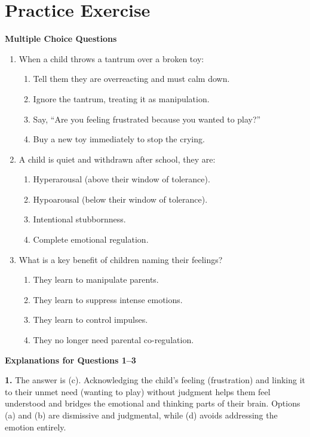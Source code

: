 \section{Practice Exercise}
\begin{practiceexercise}
\textbf{Multiple Choice Questions}
\begin{enumerate}
    \item When a child throws a tantrum over a broken toy:
    \begin{enumerate}
        \item Tell them they are overreacting and must calm down.
        \item Ignore the tantrum, treating it as manipulation.
        \item Say, ``Are you feeling frustrated because you wanted to play?''
        \item Buy a new toy immediately to stop the crying.
    \end{enumerate}
    \vspace{\fill}
    \item A child is quiet and withdrawn after school, they are:
    \begin{enumerate}
        \item Hyperarousal (above their window of tolerance).
        \item Hypoarousal (below their window of tolerance).
        \item Intentional stubbornness.
        \item Complete emotional regulation.
    \end{enumerate}
    \vspace{\fill}
    \item What is a key benefit of children naming their feelings?
    \begin{enumerate}
        \item They learn to manipulate parents.
        \item They learn to suppress intense emotions.
        \item They learn to control impulses.
        \item They no longer need parental co-regulation.
    \end{enumerate}
\end{enumerate}
\vspace{\fill}

\newpage

\textbf{Explanations for Questions 1--3}

\textbf{1.} The answer is (c). 
Acknowledging the child's feeling (frustration) and linking it to their unmet need (wanting to play) without judgment helps them feel understood and bridges the emotional and thinking parts of their brain. 
Options (a) and (b) are dismissive and judgmental, while (d) avoids addressing the emotion entirely.


\end{practiceexercise}
